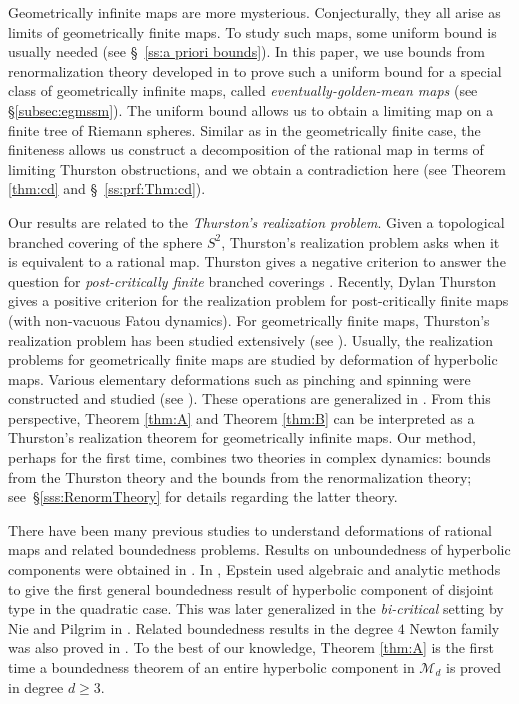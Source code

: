 \documentclass[11pt, reqno]{amsart}
\numberwithin{equation}{section}
\theoremstyle{plain}
\theoremstyle{theorem}
\theoremstyle{plain}
\theoremstyle{definition}
\numberwithin{figure}{section}
\begin{document}
Geometrically infinite maps are more mysterious.
Conjecturally, they all arise as limits of geometrically finite maps.
To study such maps, some uniform bound is usually needed (see \S~\ref{ss:a priori bounds}).
In this paper, we use bounds from renormalization theory developed in \cite{DL22,DLL25} to prove such a uniform bound for a special class of geometrically infinite maps, called {\em eventually-golden-mean maps} (see \S \ref{subsec:egmssm}).
The uniform bound allows us to obtain a limiting map on a finite tree of Riemann spheres.
Similar as in the geometrically finite case, the finiteness allows us construct a decomposition of the rational map in terms of limiting Thurston obstructions, and we obtain a contradiction here (see Theorem \ref{thm:cd} and \S~\ref{ss:prf:Thm:cd}).


Our results are related to the {\em Thurston's realization problem}.
Given a topological branched covering of the sphere $S^2$, Thurston's realization problem asks when it is equivalent to a rational map.
Thurston gives a negative criterion to answer the question for {\em post-critically finite} branched coverings \cite{DH93}. Recently, Dylan Thurston gives a positive criterion for the realization problem for post-critically finite maps \cite{Thu20} (with non-vacuous Fatou dynamics). For geometrically finite maps, 
Thurston's realization problem has been studied extensively (see \cite{DH93, CJS04, CJ11, CT11, CT18}).
Usually, the realization problems for geometrically finite maps are studied by deformation of hyperbolic maps.
Various elementary deformations such as pinching and spinning were constructed and studied (see \cite{Makienko00, TanLei02, HT04, PT04, CT18}).
These operations are generalized in \cite{Luo21a, Luo21b}.
From this perspective, Theorem \ref{thm:A} and Theorem \ref{thm:B} can be interpreted as a Thurston's realization theorem for geometrically infinite maps.
Our method, perhaps for the first time, combines two theories in complex dynamics: bounds from the Thurston theory and the bounds from the renormalization theory; see~\S\ref{sss:RenormTheory} for details regarding the latter theory.

There have been many previous studies to understand deformations of rational maps and related boundedness problems.
Results on unboundedness of hyperbolic components were obtained in \cite{Makienko00,TanLei02}. 
In \cite{Epstein00}, Epstein used algebraic and analytic methods to give the first general boundedness result of hyperbolic component of disjoint type in the quadratic case.
This was later generalized in the {\em bi-critical} setting by Nie and Pilgrim in \cite{NP19}.
Related boundedness results in the degree $4$ Newton family was also proved in \cite{NP20}.
To the best of our knowledge, Theorem \ref{thm:A} is the first time a boundedness theorem of an entire hyperbolic component in $\mathcal{M}_d$ is proved in degree $d\geq 3$.
\end{document}
